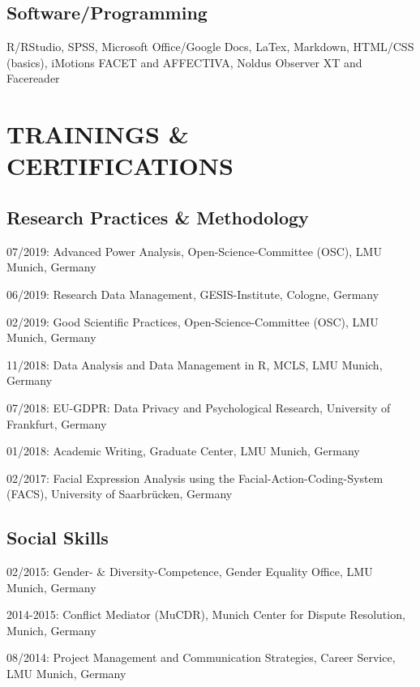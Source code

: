 \documentclass[letterpaper]{article}
\renewenvironment{itemize}{ %
  \begin{list}{}{ %
    \setlength{\leftmargin}{2.5em} %
  }
}{
  \end{list}
}
\begin{document}
\subsection*{Software/Programming}
\begin{itemize}
\item R/RStudio, SPSS, Microsoft Office/Google Docs, LaTex, Markdown, HTML/CSS (basics), iMotions FACET and AFFECTIVA, Noldus Observer XT and Facereader
\end{itemize}


\section*{TRAININGS \& CERTIFICATIONS}
\subsection*{Research Practices \& Methodology}
\begin{itemize}
\item 07/2019: Advanced Power Analysis, Open-Science-Committee (OSC), LMU Munich, Germany
\item 06/2019: Research Data Management, GESIS-Institute, Cologne, Germany
\item 02/2019: Good Scientific Practices, Open-Science-Committee (OSC), LMU Munich, Germany
\item 11/2018: Data Analysis and Data Management in R, MCLS, LMU Munich, Germany
\item 07/2018: EU-GDPR: Data Privacy and Psychological Research, University of Frankfurt, Germany
\item 01/2018: Academic Writing, Graduate Center, LMU Munich, Germany
\item 02/2017: Facial Expression Analysis using the Facial-Action-Coding-System (FACS), University of Saarbrücken, Germany
\end{itemize}

\subsection*{Social Skills}
\begin{itemize}
\item 02/2015: Gender- \& Diversity-Competence, Gender Equality Office, LMU Munich, Germany
\item 2014-2015: Conflict Mediator (MuCDR),  Munich Center for Dispute Resolution, Munich, Germany
\item 08/2014: Project Management and Communication Strategies, Career Service, LMU Munich, Germany
\end{itemize}
\end{document}

